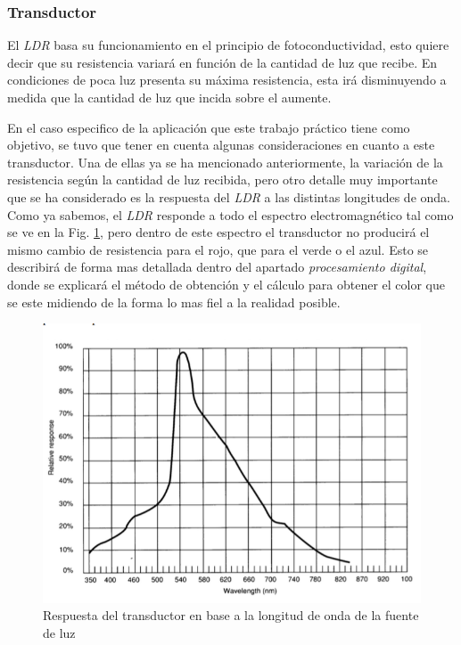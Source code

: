 \documentclass[12pt,a4paper,twoside,fleqn]{article}
\begin{document}
\subsubsection*{Transductor}
El \textit{LDR} basa su funcionamiento en el principio de fotoconductividad, esto quiere decir que su resistencia variará en función de la cantidad de luz que recibe. En condiciones de poca luz presenta su máxima resistencia, esta irá disminuyendo a medida que la cantidad de luz que incida sobre el aumente.\par
En el caso especifico de la aplicación que este trabajo práctico tiene como objetivo, se tuvo que tener en cuenta algunas consideraciones en cuanto a este transductor. Una de ellas ya se ha mencionado anteriormente, la variación de la resistencia según la cantidad de luz recibida, pero otro detalle muy importante que se ha considerado es la respuesta del \textit{LDR} a las distintas longitudes de onda. Como ya sabemos, el \textit{LDR} responde a todo el espectro electromagnético tal como se ve en la Fig. \ref{fig:wave-ldr}, pero dentro de este espectro el transductor no producirá el mismo cambio de resistencia para el rojo, que para el verde o el azul. Esto se describirá de forma mas detallada dentro del apartado \textit{procesamiento digital}, donde se explicará el método de obtención y el cálculo para obtener el color que se este midiendo de la forma lo mas fiel a la realidad posible.

\begin{figure}
    \centering
    \includegraphics[width=0.7\linewidth]{img/wavelength.png}
    \caption{Respuesta del transductor en base a la longitud de onda de la fuente de luz}
    \label{fig:wave-ldr}
\end{figure}
\end{document}
